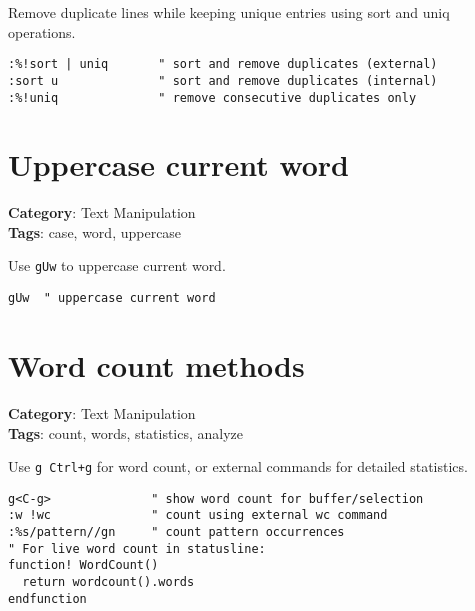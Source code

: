 {{{{{{{{{{{{{{{Remove duplicate lines while keeping unique entries using sort and uniq operations.

\begin{Exa*}{}
\begin{Verbatim}[fontsize=\footnotesize, breaklines, breakanywhere]
:%!sort | uniq       " sort and remove duplicates (external)
:sort u              " sort and remove duplicates (internal)
:%!uniq              " remove consecutive duplicates only
\end{Verbatim}
\end{Exa*}

\section{Uppercase current word}

\textbf{Category}: Text Manipulation\\ \textbf{Tags}: case, word, uppercase
\vspace{0.5cm}

Use {\footnotesize \Verb§gUw§} to uppercase current word.

\begin{Exa*}{}
\begin{Verbatim}[fontsize=\footnotesize, breaklines, breakanywhere]
gUw  " uppercase current word
\end{Verbatim}
\end{Exa*}

\section{Word count methods}

\textbf{Category}: Text Manipulation\\ \textbf{Tags}: count, words, statistics, analyze
\vspace{0.5cm}

Use {\footnotesize \Verb§g Ctrl+g§} for word count, or external commands for detailed statistics.

\begin{Exa*}{}
\begin{Verbatim}[fontsize=\footnotesize, breaklines, breakanywhere]
g<C-g>              " show word count for buffer/selection
:w !wc              " count using external wc command
:%s/pattern//gn     " count pattern occurrences
" For live word count in statusline:
function! WordCount()
  return wordcount().words
endfunction
\end{Verbatim}
\end{Exa*}

}}}}}}}}}}}}}}}
